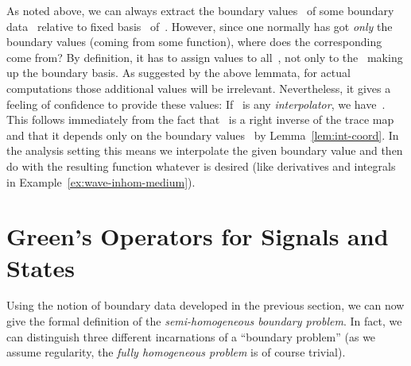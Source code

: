 \documentclass[a4paper]{llncs}
\begin{document}
As noted above, we can always extract the boundary values~ of some boundary data~ relative to fixed
basis~ of~. However, since one normally has got \emph{only}
the boundary values (coming from some function), where does the corresponding~ come from? By definition, it has to assign values to all~, not only to the~ making up the boundary basis. As suggested by
the above lemmata, for actual computations those additional values will be
irrelevant. Nevertheless, it gives a feeling of confidence to provide these
values: If~ is any \emph{interpolator}, we have~. This follows immediately from the fact
that~ is a right inverse of the trace map and that it depends only
on the boundary values~ by Lemma~\ref{lem:int-coord}. In the
analysis setting this means we interpolate the given boundary value and then do
with the resulting function whatever is desired (like derivatives and integrals
in Example~\ref{ex:wave-inhom-medium}).


\section{Green's Operators for Signals and States}
\label{sec:greens-operators}


Using the notion of boundary data developed in the previous section, we can now
give the formal definition of the \emph{semi-homogeneous boundary problem}. In
fact, we can distinguish three different incarnations of a ``boundary problem''
(as we assume regularity, the \emph{fully homogeneous problem} is of course
trivial).
\end{document}
